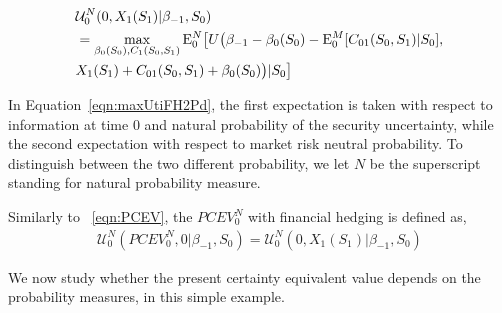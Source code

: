 \documentclass{article}[12pt letter]
\newtheorem{lemma}[theorem]{Lemma}
\newcommand{\E}{\mathrm{E}}
\begin{document}
\begin{align} \label{eqn:maxUtiFH2Pd}
    &\mathcal{U}^N_0(0, X_{1}(S_1)|\beta_{-1},S_0) \nonumber \\
    & = \max_{\beta_0(S_0), C_1(S_0,S_1)} \E_0^N \big{[}U\big{(}\beta_{-1}-\beta_0(S_0)-\E_0^M[C_{01}(S_0,S_1)|S_0],  \nonumber \\ & X_1(S_1)+ C_{01}(S_0,S_1) + \beta_{0}(S_0)\big{)}|S_0 \big{]}
\end{align}

In Equation~\ref{eqn:maxUtiFH2Pd}, the first expectation is taken with respect to information at time 0 and natural probability of the security uncertainty, while the second expectation with respect to market risk neutral probability. To distinguish between the two different probability, we let $N$ be the superscript standing for natural probability measure. 

Similarly to ~\ref{eqn:PCEV}, the $PCEV^N_0$ with financial hedging is defined as,
\begin{align} \label{eqn:PCEV-FH2Period}
\mathcal{U}^N_0(PCEV_0^N, 0|\beta_{-1},S_0) = \mathcal{U}^N_0(0, X_1(S_1) |\beta_{-1},S_0)
\end{align}


%
%


We now study whether the present certainty equivalent value depends on the probability measures, in this simple example.
\end{document}
